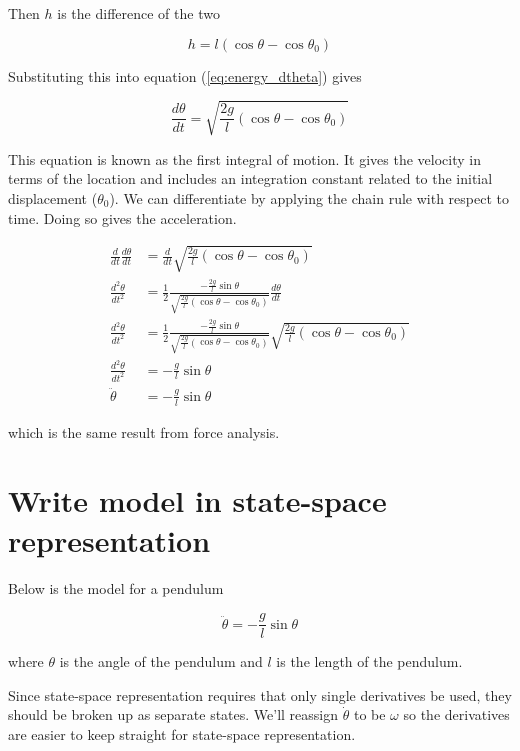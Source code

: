 Then $h$ is the difference of the two

\begin{equation*}
  h = l(\cos\theta - \cos\theta_0)
\end{equation*}

Substituting this into equation (\ref{eq:energy_dtheta}) gives

\begin{equation*}
  \frac{d\theta}{dt} = \sqrt{\frac{2g}{l}(\cos\theta - \cos\theta_0)}
\end{equation*}

This equation is known as the first integral of motion. It gives the velocity in
terms of the location and includes an integration constant related to the
initial displacement ($\theta_0$). We can differentiate by applying the chain
rule with respect to time. Doing so gives the acceleration.

\begin{align*}
  \frac{d}{dt}\frac{d\theta}{dt} &=
    \frac{d}{dt}\sqrt{\frac{2g}{l}(\cos\theta - \cos\theta_0)} \\
  \frac{d^2\theta}{dt^2} &= \frac{1}{2}\frac
    {-\frac{2g}{l}\sin\theta}
    {\sqrt{\frac{2g}{l}(\cos\theta - \cos\theta_0)}}\frac{d\theta}{dt} \\
  \frac{d^2\theta}{dt^2} &= \frac{1}{2}\frac
    {-\frac{2g}{l}\sin\theta}
    {\sqrt{\frac{2g}{l}(\cos\theta - \cos\theta_0)}}
    \sqrt{\frac{2g}{l}(\cos\theta - \cos\theta_0)} \\
  \frac{d^2\theta}{dt^2} &= -\frac{g}{l}\sin\theta \\
  \ddot{\theta} &= -\frac{g}{l}\sin\theta
\end{align*}

which is the same result from force analysis.

\section{Write model in state-space representation}

Below is the \gls{model} for a pendulum

\begin{equation*}
  \ddot{\theta} = -\frac{g}{l}\sin\theta
\end{equation*}

where $\theta$ is the angle of the pendulum and $l$ is the length of the
pendulum.

Since state-space representation requires that only single derivatives be used,
they should be broken up as separate states. We'll reassign $\dot{\theta}$ to be
$\omega$ so the derivatives are easier to keep straight for state-space
representation.

